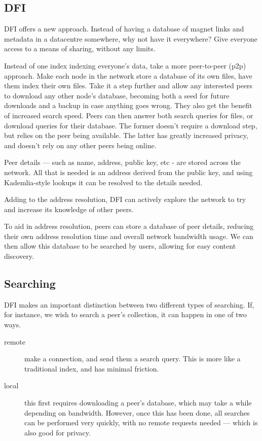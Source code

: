 \subsection{DFI}
\begin{multicols}{2}
	DFI offers a new approach. Instead of having a database of magnet links and
	metadata in a datacentre somewhere, why not have it everywhere? Give
	everyone access to a means of sharing, without any limits. 

	Instead of one index indexing everyone's data, take a more peer-to-peer (p2p) approach. Make
	each node in the network store a database of its own files, have them index 
	their own files. Take it a step further and allow any interested peers to
	download any other node's database, becoming both a seed for future downloads
	and a backup in case anything goes wrong. They also get the benefit of
	increased search speed. Peers can then answer both search queries for files,
	or download queries for their database. The former doesn't require a
	download step, but relies on the peer being available. The latter has greatly
	increased privacy, and doesn't rely on any other peers being online.

	Peer details --- such as name, address, public key, etc - are stored across
	the network. All that is needed is an address derived from the public key,
	and using Kademlia-style \cite{kademlia} lookups it can be resolved to the details needed.

	Adding to the address resolution, DFI can actively explore the network to
	try and increase its knowledge of other peers. 

	To aid in address resolution, peers can store a database of peer details,
	reducing their own address resolution time and overall network bandwidth
	usage. We can then allow this database to be searched by users, allowing for
	easy content discovery.
\end{multicols}

	\subsection{Searching}
	\begin{multicols}{2}
	DFI makes an important distinction between two different types of searching.
	If, for instance, we wish to search a peer's collection, it can happen in
	one of two ways.

	\begin{description}
		\item[remote] make a connection, and send them a search query.
	                  This is more like a traditional index, and has minimal 
					  friction.
		\item[local] this first requires downloading a peer's database,
		             which may take a while depending on bandwidth. However,
					 once this has been done, all searches can be performed very
					 quickly, with no remote requests needed --- which is also
					 good for privacy.

	\end{description}
\end{multicols}
	
